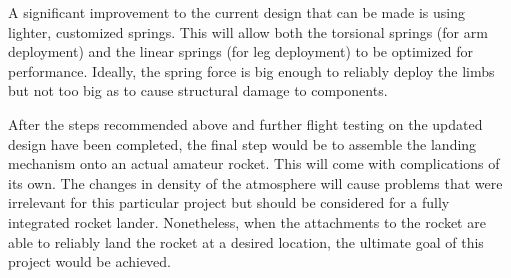 A significant improvement to the current design that can be made is using lighter, customized springs. This will allow both the torsional springs (for arm deployment) and the linear springs (for leg deployment) to be optimized for performance. Ideally, the spring force is big enough to reliably deploy the limbs but not too big as to cause structural damage to components.

After the steps recommended above and further flight testing on the updated design have been completed, the final step would be to assemble the landing mechanism onto an actual amateur rocket. This will come with complications of its own. The changes in density of the atmosphere will cause problems that were irrelevant for this particular project but should be considered for a fully integrated rocket lander. Nonetheless, when the attachments to the rocket are able to reliably land the rocket at a desired location, the ultimate goal of this project would be achieved.